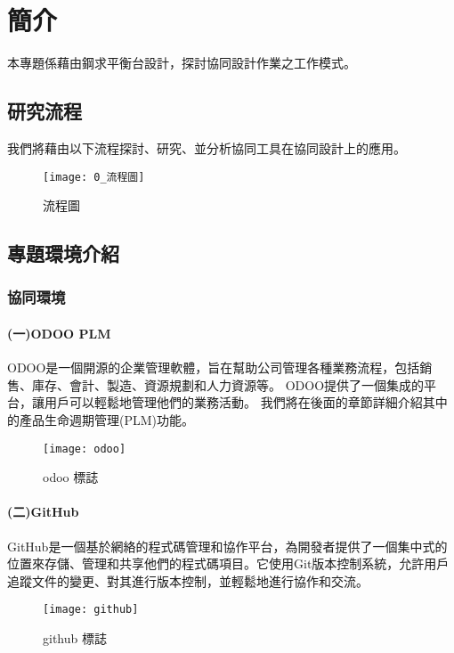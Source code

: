 \chapter{簡介}
\renewcommand{\baselinestretch}{10.0} %
\setcounter{page}{1}  %
\fontsize{14pt}{2.5pt}\sectionef

本專題係藉由鋼求平衡台設計，探討協同設計作業之工作模式。

\section{研究流程}
我們將藉由以下流程探討、研究、並分析協同工具在協同設計上的應用。\\

\begin{figure}[hbt!]
\center
\texttt{[image: 0\_流程圖]}
\caption{\Large 流程圖}\label{0_流程圖}
\end{figure}
\newpage
\section{專題環境介紹}
\subsection{協同環境}

\subsubsection{(一)ODOO PLM}

ODOO是一個開源的企業管理軟體，旨在幫助公司管理各種業務流程，包括銷售、庫存、會計、製造、資源規劃和人力資源等。
ODOO提供了一個集成的平台，讓用戶可以輕鬆地管理他們的業務活動。
我們將在後面的章節詳細介紹其中的產品生命週期管理(PLM)功能。\\
\begin{figure}[hbt!]
\center
\texttt{[image: odoo]}
\caption{\Large odoo 標誌}
\end{figure}

\subsubsection{(二)GitHub}
GitHub是一個基於網絡的程式碼管理和協作平台，為開發者提供了一個集中式的位置來存儲、管理和共享他們的程式碼項目。它使用Git版本控制系統，允許用戶追蹤文件的變更、對其進行版本控制，並輕鬆地進行協作和交流。\\
\begin{figure}[hbt!]
\center
\texttt{[image: github]}
\caption{\Large github 標誌}
\end{figure}


